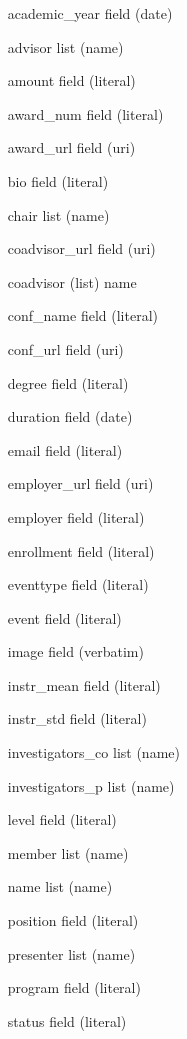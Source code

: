 \documentclass[11pt,letterpaper]{article}
\newcommand{\field}[1]{\textsf{#1}}
\begin{document}
\begin{itemize}
    \item[\field{academic\_year}] field (date)
    \item[\field{advisor}] list (name)
    \item[\field{amount}] field (literal)
    \item[\field{award\_num}] field (literal)
    \item[\field{award\_url}] field (uri)
    \item[\field{bio}] field (literal)
    \item[\field{chair}] list (name)
    \item[\field{coadvisor\_url}] field (uri)
    \item[\field{coadvisor}] (list) name
    \item[\field{conf\_name}] field (literal)
    \item[\field{conf\_url}] field (uri)
    \item[\field{degree}] field (literal)
    \item[\field{duration}] field (date)
    \item[\field{email}] field (literal)
    \item[\field{employer\_url}] field (uri)
    \item[\field{employer}] field (literal)
    \item[\field{enrollment}] field (literal)
    \item[\field{eventtype}] field (literal)
    \item[\field{event}] field (literal)
    \item[\field{image}] field (verbatim)
    \item[\field{instr\_mean}] field (literal)
    \item[\field{instr\_std}] field (literal)
    \item[\field{investigators\_co}] list (name)
    \item[\field{investigators\_p}] list (name)
    \item[\field{level}] field (literal)
    \item[\field{member}] list (name)
    \item[\field{name}] list (name)
    \item[\field{position}] field (literal)
    \item[\field{presenter}] list (name)
    \item[\field{program}] field (literal)
    \item[\field{status}] field (literal)

\end{itemize}
\end{document}
